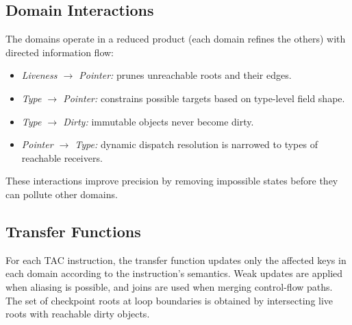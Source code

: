 \subsection{Domain Interactions}
The domains operate in a reduced product (each domain refines the others) with directed information flow:
\begin{itemize}
    \item \emph{Liveness $\rightarrow$ Pointer:} prunes unreachable roots and their edges.
    \item \emph{Type $\rightarrow$ Pointer:} constrains possible targets based on type-level field shape.
    \item \emph{Type $\rightarrow$ Dirty:} immutable objects never become dirty.
    \item \emph{Pointer $\rightarrow$ Type:} dynamic dispatch resolution is narrowed to types of reachable receivers.
\end{itemize}
These interactions improve precision by removing impossible states before they can pollute other domains.

\subsection{Transfer Functions}
For each TAC instruction, the transfer function updates only the affected keys in each domain according to the instruction’s semantics.
Weak updates are applied when aliasing is possible, and joins are used when merging control-flow paths.
The set of checkpoint roots at loop boundaries is obtained by intersecting live roots with reachable dirty objects.

